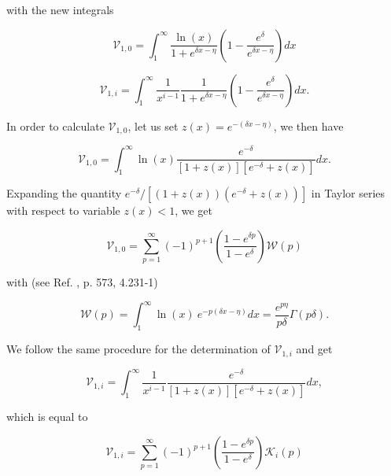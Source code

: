 \documentclass[a4paper,10pt]{article}
\begin{document}
\noindent with the new integrals

\begin{equation*}
\mathcal{V}_{1,0}=\int_1^{\infty}\frac{\ln(x)}{1+e^{\delta x-\eta}}\left(1-\frac{e^{\delta}}{e^{\delta x-\eta}}\right)dx
\end{equation*}

\begin{equation*}
\mathcal{V}_{1,i}=\int_1^{\infty}\frac{1}{x^{i-1}}\frac{1}{1+e^{\delta x-\eta}}\left(1-\frac{e^{\delta}}{e^{\delta x-\eta}}\right)dx.
\end{equation*}

\noindent In order to calculate $\mathcal{V}_{1,0}$, let us set $z(x)=e^{-\left(\delta x-\eta\right)}$, we then have

\begin{equation*}
\mathcal{V}_{1,0}=\int_1^{\infty}\ln(x)\frac{e^{-\delta}}{\left[1+z(x)\right]\left[e^{-\delta}+z(x)\right]}dx.
\end{equation*}

\noindent Expanding the quantity $\displaystyle e^{-\delta}/\left [ (1+z(x))(e^{-\delta}+z(x))\right ]$ in Taylor series with respect to variable $z(x)<1$, we get

\begin{equation*}
\mathcal{V}_{1,0}=\sum_{p=1}^{\infty}(-1)^{p+1}\left(\frac{1-e^{\delta p}}{1-e^{\delta}}\right)\mathcal{W}(p)
\end{equation*}

\noindent with (see Ref. \cite{GRADSHTEYN80}, p. 573, 4.231-1)

\begin{equation*}
\mathcal{W}(p)=\int_1^{\infty}\ln(x)~e^{-p(\delta x-\eta)}dx=\frac{e^{p\eta}}{p\delta}\Gamma(p\delta).
\end{equation*}

\noindent We follow the same procedure for the determination of $\mathcal{V}_{1,i}$ and get

\begin{equation*}
\mathcal{V}_{1,i}=\int_1^{\infty}\frac{1}{x^{i-1}}\frac{e^{-\delta}}{\left[1+z(x)\right]\left[e^{-\delta}+z(x)\right]}dx,
\end{equation*}

\noindent which is equal to

\begin{equation*}
\mathcal{V}_{1,i}=\sum_{p=1}^{\infty}(-1)^{p+1}\left(\frac{1-e^{\delta p}}{1-e^{\delta}}\right)\mathcal{K}_i(p)
\end{equation*}
\end{document}
